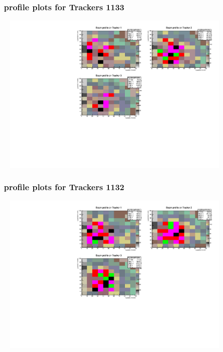 \documentclass[slidestop,compress,mathserif]{beamer}
\begin{document}
\begin{frame}\frametitle{profile plots for Trackers 1133}
	 \includegraphics[width=12cm,height=8cm]{profile_plots_for_Trackers_1133.pdf}
\end{frame}
\begin{frame}\frametitle{profile plots for Trackers 1132}
	 \includegraphics[width=12cm,height=8cm]{profile_plots_for_Trackers_1132.pdf}
\end{frame}
\end{document}

